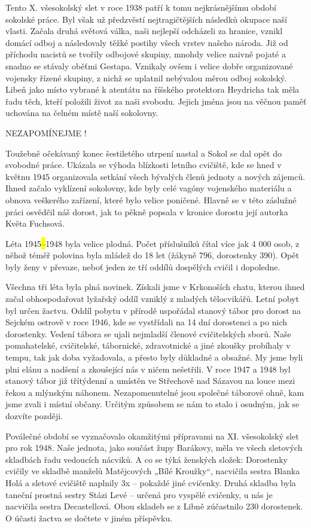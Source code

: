 Tento X. všesokolský slet v roce 1938 patří k tomu nejkrásnějšímu období
sokolské práce. Byl však už předzvěstí nejtragičtějších následků okupace
naší vlasti. Začala druhá světová válka, naši nejlepší odcházeli za
hranice, vznikl domácí odboj a následovaly těžké postihy všech vrstev
našeho národa. Již od příchodu nacistů se tvořily odbojové skupiny,
mnohdy velice naivně pojaté a snadno se stávaly oběťmi Gestapa. Vznikaly
ovšem i velice dobře organizované vojensky řízené skupiny, z nichž se
uplatnil nebývalou měrou odboj sokolský. Libeň jako místo vybrané k
atentátu na říšského protektora Heydricha tak měla řadu těch, kteří
položili život za naši svobodu. Jejich jména jsou na věčnou paměť
uchována na čelném místě naší sokolovny.

NEZAPOMÍNEJME !

Toužebně očekávaný konec šestiletého utrpení nastal a Sokol se dal opět
do svobodné práce. Ukázala se výhoda blízkosti letního cvičiště, kde se
hned v květnu 1945 organizovala setkání všech bývalých členů jednoty a
nových zájemců. Ihned začalo vyklízení sokolovny, kde byly celé vagóny
vojenského materiálu a obnova veškerého zařízení, které bylo velice
poničené. Hlavně se v této záslužné práci osvědčil náš dorost, jak to
pěkně popsala v kronice dorostu její autorka Květa Fuchsová.

Léta 1945\emph{\hl{--}}1948 byla velice plodná. Počet příslušníků čítal
více jak 4 000 osob, z něhož téměř polovina byla mládež do 18 let
(žákyně 796, dorostenky 390). Opět byly ženy v převaze, neboť jeden ze
tří oddílů dospělých cvičil i dopoledne.

Všechna tři léta byla plná novinek. Získali jsme v Krkonoších chatu,
kterou ihned začal obhospodařovat lyžařský oddíl vzniklý z mladých
tělocvikářů. Letní pobyt byl určen žactvu. Oddíl pobytu v přírodě
uspořádal stanový tábor pro dorost na Sejckém ostrově v roce 1946, kde
se vystřídali na 14 dní dorostenci a po nich dorostenky. Vedení tábora
se ujali nejmladší členové cvičitelských sborů. Naše pomahatelské,
cvičitelské, tábornické, zdravotnické a jiné zkoušky probíhaly v tempu,
tak jak doba vyžadovala, a přesto byly důkladné a obsažné. My jsme byli
plni elánu a nadšení a zkoušející nás v ničem nešetřili. V roce 1947 a
1948 byl stanový tábor již třítýdenní a umístěn ve Střechově nad Sázavou
na louce mezi řekou a mlýnským náhonem. Nezapomenutelné jsou společné
táborové ohně, kam jsme zvali i místní občany. Určitým způsobem se nám
to stalo i osudným, jak se dozvíte později.

Poválečné období se vyznačovalo okamžitými přípravami na XI. všesokolský
slet pro rok 1948. Naše jednota, jako součást župy Barákovy, měla ve
všech sletových skladbách řadu vedoucích nácviků. A co se týká ženských
složek: Dorostenky cvičily ve skladbě manželů Matějcových „Bílé
Kroužky``, nacvičila sestra Blanka Holá a sletové cvičiště naplnily 3x
-- pokaždé jiné cvičenky. Druhá skladba byla taneční prostná sestry
Stázi Levé -- určená pro vyspělé cvičenky, u nás je nacvičila sestra
Decastellová. Obou skladeb se z Libně zúčastnilo 230 dorostenek. O
účasti žactva se dočtete v jiném příspěvku.


